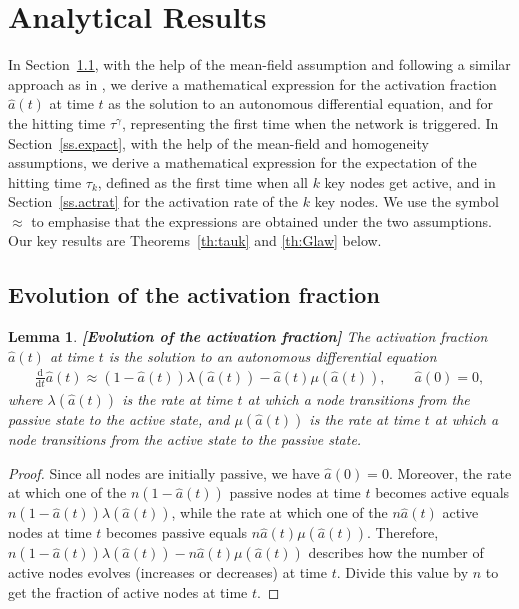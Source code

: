 \documentclass[11pt]{article}
\newtheorem{Lemma}[Theorem]{Lemma}
\numberwithin{equation}{section}
\begin{document}

\section{Analytical Results}
\label{s.math}

In Section~\ref{ss.evolact}, with the help of the mean-field assumption and following a similar approach as in \cite{Aging}, we derive a mathematical expression for the activation fraction $\hat{a}(t)$ at time $t$ as the solution to an autonomous differential equation, and for the hitting time $\tau^\gamma$, representing the first time when the network is triggered. In Section~\ref{ss.expact}, with the help of the mean-field and homogeneity assumptions, we derive a mathematical expression for the expectation of the hitting time $\tau_k$, defined as the first time when all $k$ key nodes get active, and in Section~\ref{ss.actrat} for the activation rate of the $k$ key nodes. We use the symbol $\approx$ to emphasise that the expressions are obtained under the two assumptions. Our key results are Theorems~\ref{th:tauk} and \ref{th:Glaw} below. 


\subsection{Evolution of the activation fraction}
\label{ss.evolact}

\begin{Lemma}{\bf [Evolution of the activation fraction]}
\label{Lem1}
The activation fraction $\hat{a}(t)$ at time $t$ is the solution to an autonomous differential equation 
\begin{align}
\label{AP-Ahat}
\frac{\mathrm{d}}{\mathrm{d}t}\hat{a}(t)\approx(1-\hat{a}(t))\lambda(\hat{a}(t))-\hat{a}(t)\mu(\hat{a}(t)),\qquad \hat{a}(0)=0,
\end{align}
where $\lambda(\hat{a}(t))$ is the rate at time $t$ at which a node transitions from the passive state to the active state, and $\mu(\hat{a}(t))$ is the rate at time $t$ at which a node transitions from the active state to the passive state.
\end{Lemma}

\begin{proof}
Since all nodes are initially passive, we have $\hat{a}(0)=0$. Moreover, the rate at which one of the $n(1-\hat{a}(t))$ passive nodes at time $t$ becomes active equals $n(1-\hat{a}(t))\lambda(\hat{a}(t))$, while the rate at which one of the $n\hat{a}(t)$ active nodes at time $t$ becomes passive equals $n\hat{a}(t)\mu(\hat{a}(t))$. Therefore, $n(1-\hat{a}(t))\lambda(\hat{a}(t))-n\hat{a}(t)\mu(\hat{a}(t))$ describes how the number of active nodes evolves (increases or decreases) at time $t$. Divide this value by $n$ to get the fraction of active nodes at time $t$.
\end{proof}
\end{document}
